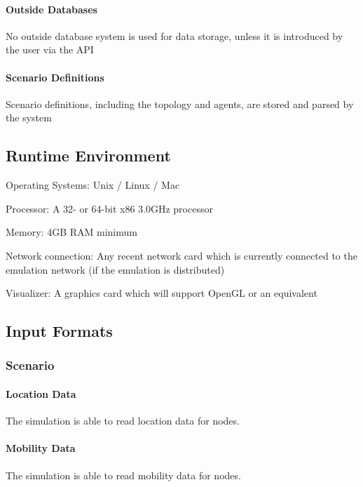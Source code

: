 \documentclass[titlepage]{article}
\begin{document}
    \paragraph{Outside Databases} No outside database system is used for data storage, unless it is introduced by the user via the API
    \paragraph{Scenario Definitions} Scenario definitions, including the topology and agents, are stored and parsed by the system


\subsection{Runtime Environment} 
\begin{itemize*}
    \item Operating Systems:  Unix / Linux / Mac
    \item Processor:  A 32- or 64-bit x86 3.0GHz processor
    \item Memory:  4GB RAM minimum
    \item Network connection:  Any recent network card which is currently connected to the emulation network (if the emulation is distributed)
    \item Visualizer:  A graphics card which will support OpenGL or an equivalent
\end{itemize*}


\subsection{Input Formats%
  \label{input-formats}%
}

\subsubsection{Scenario}
    \paragraph{Location Data} The simulation is able to read location data for nodes.
	\paragraph{Mobility Data} The simulation is able to read mobility data for nodes.
\end{document}
